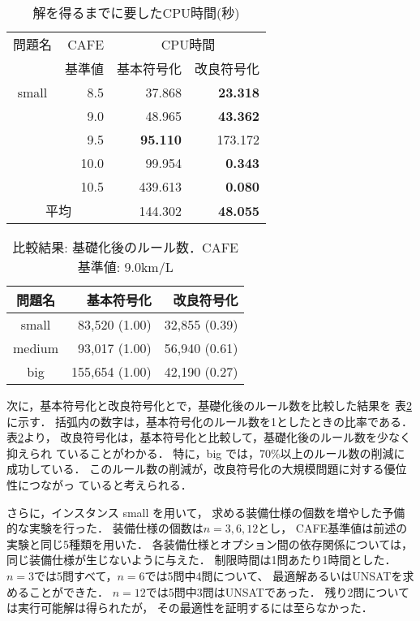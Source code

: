 \begin{table}[tbp]
 \caption{解を得るまでに要したCPU時間(秒)}
 \centering
 \begin{tabular}{c|r|rr}\bhline
  問題名 & CAFE  & \multicolumn{2}{c}{CPU時間} \\ \cline{3-4}   
        & 基準値 & 基本符号化  & 改良符号化 \\ \hline
  small & 8.5  & 37.868          & \textbf{23.318}   \\
  	& 9.0  & 48.965          & \textbf{43.362}   \\
  	& 9.5  & \textbf{95.110} & 173.172           \\
  	& 10.0 & 99.954          & \textbf{0.343}    \\
  	& 10.5 & 439.613         & \textbf{0.080}    \\ \hline \hline
  \multicolumn{2}{c}{平均}  & 144.302         & \textbf{48.055}   \\ \hline
 \end{tabular}
 \label{tab:cpu_time}
\end{table}
\begin{table}[tb]
 \caption{比較結果: 基礎化後のルール数．CAFE基準値: 9.0km/L}
 \centering
 \begin{tabular}{crr} \bhline
  問題名    & 基本符号化    & 改良符号化    \\ \hline
  small	    &  83,520 (1.00)  & 32,855 (0.39) \\ 
  medium    &  93,017 (1.00)  & 56,940 (0.61) \\
  big	    & 155,654 (1.00)  & 42,190 (0.27) \\ \hline
 \end{tabular}
 \label{tab:rule}
\end{table}

次に，基本符号化と改良符号化とで，基礎化後のルール数を比較した結果を
表\ref{tab:rule}に示す．
括弧内の数字は，基本符号化のルール数を1としたときの比率である．
表\ref{tab:rule}より，
改良符号化は，基本符号化と比較して，基礎化後のルール数を少なく抑えられ
ていることがわかる．
特に，big では，70\%以上のルール数の削減に成功している．
このルール数の削減が，改良符号化の大規模問題に対する優位性につながっ
ていると考えられる．

さらに，インスタンス small を用いて，
求める装備仕様の個数を増やした予備的な実験を行った．
装備仕様の個数は$n=3, 6, 12$とし，
CAFE基準値は前述の実験と同じ5種類を用いた．
各装備仕様とオプション間の依存関係については，
同じ装備仕様が生じないように与えた．
制限時間は1問あたり1時間とした．
$n=3$では5問すべて，$n=6$では5問中4問について、
最適解あるいは\textsf{UNSAT}を求めることができた．
$n=12$では5問中3問は\textsf{UNSAT}であった．
残り2問については実行可能解は得られたが，
その最適性を証明するには至らなかった．





